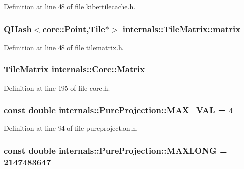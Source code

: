 \-Definition at line 48 of file kibertilecache.\-h.

\hypertarget{group___o_p_map_widget_gaecc6fdfe28242560867ab83c02820b20}{
\subsubsection[{matrix}]{\setlength{\rightskip}{0pt plus 5cm}\-Q\-Hash$<${\bf core\-::\-Point},\-Tile$\ast$$>$ {\bf internals\-::\-Tile\-Matrix\-::matrix}}}\label{group___o_p_map_widget_gaecc6fdfe28242560867ab83c02820b20}


\-Definition at line 48 of file tilematrix.\-h.

\hypertarget{group___o_p_map_widget_ga4ac91c5f728a51e821a9cec0abf347fd}{
\subsubsection[{\-Matrix}]{\setlength{\rightskip}{0pt plus 5cm}\-Tile\-Matrix {\bf internals\-::\-Core\-::\-Matrix}}}\label{group___o_p_map_widget_ga4ac91c5f728a51e821a9cec0abf347fd}


\-Definition at line 195 of file core.\-h.

\hypertarget{group___o_p_map_widget_ga34e30a80435ba07c4e95b56f24935ceb}{
\subsubsection[{\-M\-A\-X\-\_\-\-V\-A\-L}]{\setlength{\rightskip}{0pt plus 5cm}const double {\bf internals\-::\-Pure\-Projection\-::\-M\-A\-X\-\_\-\-V\-A\-L} = 4}}\label{group___o_p_map_widget_ga34e30a80435ba07c4e95b56f24935ceb}


\-Definition at line 94 of file pureprojection.\-h.

\hypertarget{group___o_p_map_widget_gad58d07a94d560015458a3411190b5cc0}{
\subsubsection[{\-M\-A\-X\-L\-O\-N\-G}]{\setlength{\rightskip}{0pt plus 5cm}const double {\bf internals\-::\-Pure\-Projection\-::\-M\-A\-X\-L\-O\-N\-G} = 2147483647}}\label{group___o_p_map_widget_gad58d07a94d560015458a3411190b5cc0}


